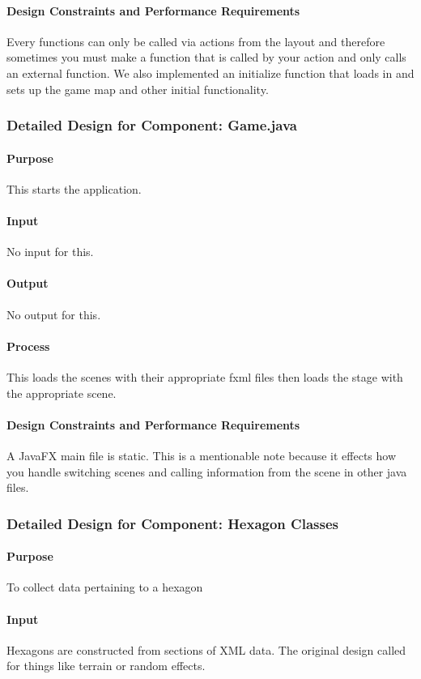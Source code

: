 \documentclass[12pt,a4paper,titlepage]{article}
\begin{document}
\paragraph{Design Constraints and Performance Requirements}	Every functions can only be called via actions from the layout and therefore sometimes you must make a function that  is called by your action and only calls an external function.  We also implemented an initialize function that loads in and sets up the game map and other initial functionality.

\subsubsection{Detailed Design for Component: Game.java}
\paragraph{Purpose} This starts the application.
\paragraph{Input} No input for this.
\paragraph{Output} No output for this.
\paragraph{Process} This loads the scenes with their appropriate fxml files then loads the stage with the appropriate scene.
\paragraph{Design Constraints and Performance Requirements}	A JavaFX main file is static.  This is a mentionable note because it effects how you handle switching scenes and calling information from the scene in other java files.

\subsubsection{Detailed Design for Component: Hexagon Classes}
\paragraph{Purpose} To collect data pertaining to a hexagon
\paragraph{Input}
Hexagons are constructed from sections of XML data.
The original design called for things like terrain or random effects.
\end{document}
